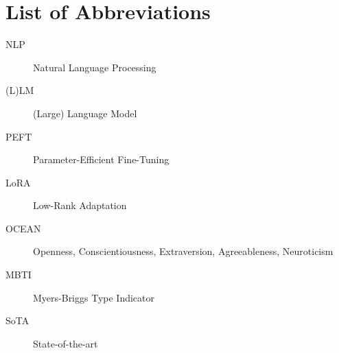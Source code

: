 \documentclass{DESSThesis}
\begin{document}
\let\cleardoublepage\clearpage

\def \TypeofThesis{Master Thesis}
\def \TitleofThesis{Personality Assessment of Language Models using Task Arithmetic and PEFT}
\def \AuthorofThesis{Prayag Bhattarai\\MSc. Business Informatics\\1825720}
\def \FirstSupervisor{Prof. Dr. Markus Strohmaier}
\def \Advisor{Georg Ahnert}



\chapter*{List of Abbreviations}
\begin{description}
\item[NLP] Natural Language Processing
\item[(L)LM] (Large) Language Model
\item[PEFT] Parameter-Efficient Fine-Tuning
\item[LoRA] Low-Rank Adaptation
  \item[OCEAN] Openness, Conscientiousness, Extraversion, Agreeableness, Neuroticism
\item[MBTI] Myers-Briggs Type Indicator
\item[SoTA] State-of-the-art
\end{description}
\end{document}
